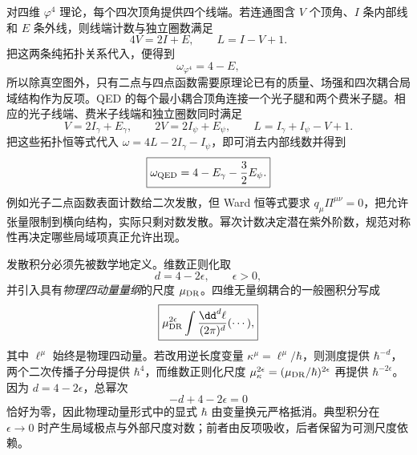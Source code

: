 对四维 \(\varphi^4\) 理论，每个四次顶角提供四个线端。若连通图含 $V$ 个顶角、$I$ 条内部线和 $E$ 条外线，则线端计数与独立圈数满足
\begin{equation}
 \boxed{
 4V=2I+E,
 \qquad
 L=I-V+1.}
 \label{eq:phi4-topology-r68}
\end{equation}
把这两条纯拓扑关系代入，便得到
\begin{equation}
 \boxed{\omega_{\varphi^4}=4-E,}
 \label{eq:phi4-superficial-degree-dp10}
\end{equation}
所以除真空图外，只有二点与四点函数需要原理论已有的质量、场强和四次耦合局域结构作为反项。QED 的每个最小耦合顶角连接一个光子腿和两个费米子腿。相应的光子线端、费米子线端和独立圈数同时满足
\begin{equation}
 \boxed{
 V=2I_\gamma+E_\gamma,
 \qquad
 2V=2I_\psi+E_\psi,
 \qquad
 L=I_\gamma+I_\psi-V+1.}
 \label{eq:qed-topology-r68}
\end{equation}
把这些拓扑恒等式代入 $\omega=4L-2I_\gamma-I_\psi$，即可消去内部线数并得到
\begin{equation}
 \boxed{
 \omega_{\rm QED}=4-E_\gamma-\frac32E_\psi.}
 \label{eq:qed-superficial-degree-dp10}
\end{equation}
例如光子二点函数表面计数给二次发散，但 Ward 恒等式要求 \(q_\mu\Pi^{\mu\nu}=0\)，把允许张量限制到横向结构，实际只剩对数发散。幂次计数决定潜在紫外阶数，规范对称性再决定哪些局域项真正允许出现。

发散积分必须先被数学地定义。维数正则化取
\begin{equation*}
 d=4-2\epsilon,
 \qquad \epsilon>0,
\end{equation*}
并引入具有\emph{物理四动量量纲}的尺度 \(\mu_{\rm DR}\)。四维无量纲耦合的一般圈积分写成
\begin{equation}
 \boxed{
 \mu_{\rm DR}^{2\epsilon}
 \int\frac{\dd^d \ell}{(2\pi)^d}(\cdots),}
 \label{eq:dim-reg-measure-general-dp10}
\end{equation}
其中 $\ell^\mu$ 始终是物理四动量。若改用逆长度变量 $\kappa^\mu=\ell^\mu/\hbar$，则测度提供 $\hbar^{-d}$，两个二次传播子分母提供 $\hbar^4$，而维数正则化尺度 $\mu_\kappa^{2\epsilon}=(\mu_{\rm DR}/\hbar)^{2\epsilon}$ 再提供 $\hbar^{-2\epsilon}$。因为 $d=4-2\epsilon$，总幂次
\[
 -d+4-2\epsilon=0
\]
恰好为零，因此物理动量形式中的显式 $\hbar$ 由变量换元严格抵消。典型积分在 $\epsilon\to0$ 时产生局域极点与外部尺度对数；前者由反项吸收，后者保留为可测尺度依赖。

